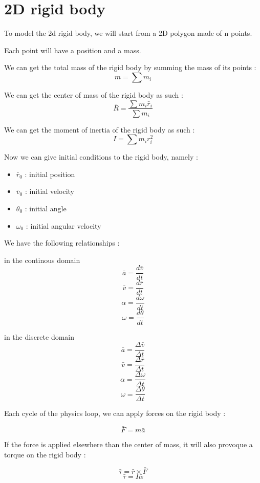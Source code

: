 \documentclass[12pt]{article}
\begin{document}
\section{2D rigid body}

To model the 2d rigid body, we will start from a 2D polygon made of n points.

Each point will have a position and a mass.

We can get the total mass of the rigid body by summing the mass of its points :
$$ m = \sum m_i $$

We can get the center of mass of the rigid body as such :
$$ \bar{R} = \frac{\sum m_i \bar{r}_i}{\sum m_i} $$

We can get the moment of inertia of the rigid body as such :
$$ I = \sum m_i r_i^2$$

Now we can give initial conditions to the rigid body, namely :

\begin{itemize}
\item $\bar{r}_0$ : initial position
\item $\bar{v}_0$ : initial velocity
\item $\theta_0$ : initial angle
\item $\omega_0$ : initial angular velocity
\end{itemize}

We have the following relationships :



\begin{multicols}{2}
in the continous domain
$$ \bar{a} = \frac{d \bar{v}}{dt}$$
$$ \bar{v} = \frac{d \bar{r}}{dt}$$
$$ \alpha = \frac{d \omega}{dt}$$
$$ \omega = \frac{d \theta}{dt}$$
\columnbreak

in the discrete domain
$$ \bar{a} = \frac{\Delta \bar{v}}{\Delta t}$$
$$ \bar{v} = \frac{\Delta \bar{r}}{\Delta t}$$
$$ \alpha = \frac{\Delta \omega}{\Delta t}$$
$$ \omega = \frac{\Delta \theta}{\Delta t}$$
\end{multicols}

Each cycle of the physics loop, we can apply forces on the rigid body :

$$ \bar{F} = m \bar{a} $$

If the force is applied elsewhere than the center of mass, it will also provoque a torque on the rigid body :

$$ \bar{\tau} = \bar{r} \times \bar{F} $$
$$ \bar{\tau} = I \bar{\alpha} $$

\newpage
\end{document}
